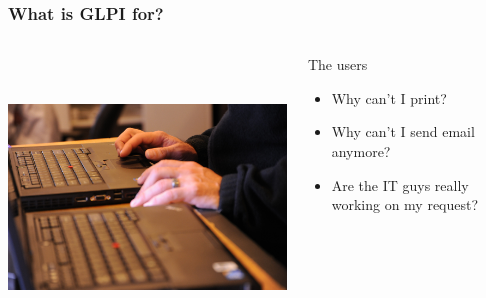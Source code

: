 \documentclass{beamer}
\begin{document}
\begin{frame}
    \frametitle{What is GLPI for?}

 \begin{columns}
 \begin{column}{0.35\textwidth}
         \includegraphics[height=7.5cm]{./pics/lenovo.jpg}
 \end{column}
 \begin{column}{0.65\textwidth}

    \begin{block}{The users}
        \begin{itemize}
            \item Why can't I print?
            \item Why can't I send email anymore?
            \item Are the IT guys really working on my request?
        \end{itemize}
    \end{block}
 \end{column}
\end{columns}

\end{frame}
\end{document}
